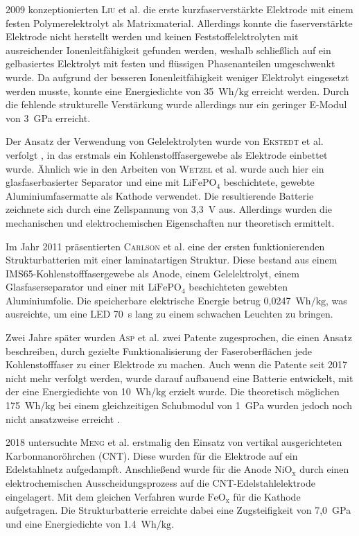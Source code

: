 2009 konzeptionierten \textsc{Liu} et al. \cite{Liu2009} die erste kurzfaserverstärkte Elektrode mit einem festen Polymerelektrolyt als Matrixmaterial. Allerdings konnte die faserverstärkte Elektrode nicht herstellt werden und keinen Feststoffelektrolyten mit ausreichender Ionenleitfähigkeit gefunden werden, weshalb schließlich auf ein gelbasiertes Elektrolyt mit festen und flüssigen Phasenanteilen umgeschwenkt wurde. Da aufgrund der besseren Ionenleitfähigkeit weniger Elektrolyt eingesetzt werden musste, konnte eine Energiedichte von 35~$\si{\watt \hour \per \kg}$ erreicht werden. Durch die fehlende strukturelle Verstärkung wurde allerdings nur ein geringer E-Modul von 3~GPa erreicht.

Der Ansatz der Verwendung von Gelelektrolyten wurde von \textsc{Ekstedt} et al. verfolgt \cite{Ekstedt2010}, in das erstmals ein Kohlenstofffasergewebe als Elektrode einbettet wurde. Ähnlich wie in den Arbeiten von \textsc{Wetzel} et al. wurde auch hier ein glasfaserbasierter Separator und eine mit $\text{LiFePO}_\text{4}$ beschichtete, gewebte Aluminiumfasermatte als Kathode verwendet. Die resultierende Batterie zeichnete sich durch eine Zellspannung von 3,3~V aus. Allerdings wurden die mechanischen und elektrochemischen Eigenschaften nur theoretisch ermittelt.

Im Jahr 2011 präsentierten \textsc{Carlson} et al. \cite{Carlson2011} eine der ersten funktionierenden Strukturbatterien mit einer laminatartigen Struktur. Diese bestand aus einem IMS65-Kohlenstofffasergewebe als Anode, einem Gelelektrolyt, einem Glasfaserseparator und einer mit $\text{LiFePO}_\text{4}$ beschichteten gewebten Aluminiumfolie. Die speicherbare elektrische Energie betrug 0,0247~$\si{\watt \hour \per \kg}$, was ausreichte, um eine LED 70~s lang zu einem schwachen Leuchten zu bringen.

Zwei Jahre später wurden \textsc{Asp} et al. \cite{Asp2013US,Asp2013CN} zwei Patente zugesprochen, die einen Ansatz beschreiben, durch gezielte Funktionalisierung der Faseroberflächen jede Kohlenstofffaser zu einer Elektrode zu machen. Auch wenn die Patente seit 2017 nicht mehr verfolgt werden, wurde darauf aufbauend eine Batterie entwickelt, mit der eine Energiedichte von 10~$\si{\watt \hour \per \kg}$ erzielt wurde. Die theoretisch möglichen 175~$\si{\watt \hour \per \kg}$ bei einem gleichzeitigen Schubmodul von 1~GPa wurden jedoch noch nicht ansatzweise erreicht \cite{Leijonmarck2013, Carlson2013}.

2018 untersuchte \textsc{Meng} et al. \cite{Meng2018} erstmalig den Einsatz von vertikal ausgerichteten Karbonnanoröhrchen (CNT). Diese wurden für die Elektrode auf ein Edelstahlnetz aufgedampft. Anschließend wurde für die Anode $\text{NiO}_\text{x}$ durch einen elektrochemischen Ausscheidungsprozess auf die CNT-Edelstahlelektrode eingelagert. Mit dem gleichen Verfahren wurde $\text{FeO}_\text{x}$ für die Kathode aufgetragen. Die Strukturbatterie erreichte dabei eine Zugsteifigkeit von 7,0~GPa und eine Energiedichte von 1.4~$\si{\watt \hour \per \kg}$.

